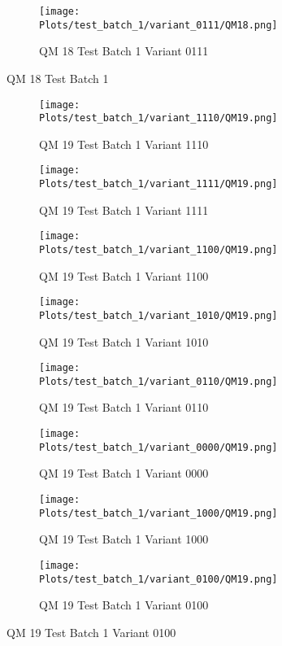 \documentclass{DissertateFigs}
\begin{document}
\begin{figure}[t!]
\medskip

    \begin{subfigure}{0.47\textwidth}
    \texttt{[image: Plots/test\_batch\_1/variant\_0111/QM18.png]}
    \caption{QM 18 Test Batch 1 Variant 0111}
    \end{subfigure}
\caption{QM 18 Test Batch 1}
    \end{figure}
\clearpage
\begin{figure}[t!]
    \begin{subfigure}{0.47\textwidth}
    \texttt{[image: Plots/test\_batch\_1/variant\_1110/QM19.png]}
    \caption{QM 19 Test Batch 1 Variant 1110}
    \end{subfigure}
    \begin{subfigure}{0.47\textwidth}
    \texttt{[image: Plots/test\_batch\_1/variant\_1111/QM19.png]}
    \caption{QM 19 Test Batch 1 Variant 1111}
    \end{subfigure}

\medskip

    \begin{subfigure}{0.47\textwidth}
    \texttt{[image: Plots/test\_batch\_1/variant\_1100/QM19.png]}
    \caption{QM 19 Test Batch 1 Variant 1100}
    \end{subfigure}
    \begin{subfigure}{0.47\textwidth}
    \texttt{[image: Plots/test\_batch\_1/variant\_1010/QM19.png]}
    \caption{QM 19 Test Batch 1 Variant 1010}
    \end{subfigure}

\medskip

    \begin{subfigure}{0.47\textwidth}
    \texttt{[image: Plots/test\_batch\_1/variant\_0110/QM19.png]}
    \caption{QM 19 Test Batch 1 Variant 0110}
    \end{subfigure}
    \begin{subfigure}{0.47\textwidth}
    \texttt{[image: Plots/test\_batch\_1/variant\_0000/QM19.png]}
    \caption{QM 19 Test Batch 1 Variant 0000}
    \end{subfigure}

\medskip

    \begin{subfigure}{0.47\textwidth}
    \texttt{[image: Plots/test\_batch\_1/variant\_1000/QM19.png]}
    \caption{QM 19 Test Batch 1 Variant 1000}
    \end{subfigure}
    \begin{subfigure}{0.47\textwidth}
    \texttt{[image: Plots/test\_batch\_1/variant\_0100/QM19.png]}
    \caption{QM 19 Test Batch 1 Variant 0100}
    \end{subfigure}


\end{figure}
\end{document}
